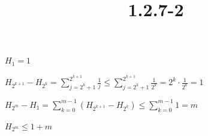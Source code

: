 \documentclass{article}
\title{1.2.7-2}
\begin{document}
\maketitle

\( H_1 = 1 \)

\( H_{2^{k+1}} - H_{2^{k}} = \sum_{j=2^{k}+1}^{2^{k+1}} \frac{1}{j} \leq \sum_{j=2^{k}+1}^{2^{k+1}} \frac{1}{2^{k}} = 2^{k} \cdot \frac{1}{2^{k}} = 1 \)

\( H_{2^m} - H_1 = \sum_{k=0}^{m-1} (H_{2^{k+1}}-H_{2^{k}}) \leq \sum_{k=0}^{m-1} 1 = m \)

\( H_{2^m} \leq 1 + m \)
\end{document}
